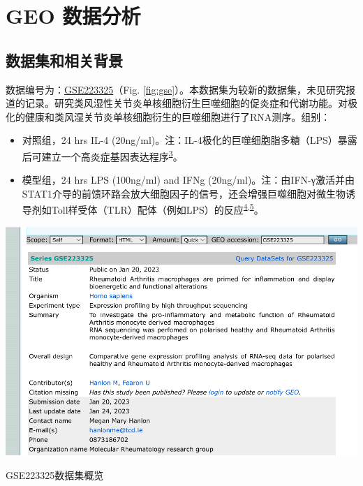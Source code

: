 \documentclass[
]{article}
\providecommand{\tightlist}{%
  \setlength{\itemsep}{0pt}\setlength{\parskip}{0pt}}
\begin{document}
\hypertarget{geo-ux6570ux636eux5206ux6790}{%
\section{GEO 数据分析}\label{geo-ux6570ux636eux5206ux6790}}

\hypertarget{ux6570ux636eux96c6ux548cux76f8ux5173ux80ccux666f}{%
\subsection{数据集和相关背景}\label{ux6570ux636eux96c6ux548cux76f8ux5173ux80ccux666f}}

数据编号为：\href{https://www.ncbi.nlm.nih.gov/geo/query/acc.cgi?acc=GSE223325}{GSE223325}（Fig. \ref{fig:gse}）。本数据集为较新的数据集，未见研究报道的记录。研究类风湿性关节炎单核细胞衍生巨噬细胞的促炎症和代谢功能。对极化的健康和类风湿关节炎单核细胞衍生的巨噬细胞进行了RNA测序。组别：

\begin{itemize}
\tightlist
\item
  对照组，24 hrs IL-4 (20ng/ml)。注：IL-4极化的巨噬细胞脂多糖（LPS）暴露后可建立一个高炎症基因表达程序\textsuperscript{\protect\hyperlink{ref-czimmerer_epigenetic_2022}{3}}。
\item
  模型组，24 hrs LPS (100ng/ml) and IFNg (20ng/ml)。注：由IFN-γ激活并由STAT1介导的前馈环路会放大细胞因子的信号，还会增强巨噬细胞对微生物诱导剂如Toll样受体（TLR）配体（例如LPS）的反应\textsuperscript{\protect\hyperlink{ref-hu_regulation_2008}{4},\protect\hyperlink{ref-chen_ifn-_2010}{5}}。
\end{itemize}

\bgroup {}
\includegraphics[width=13.89in]{thesis_fig/gse223325_capture} \caption{GSE223325数据集概览}\label{fig:gse}
\makeatletter \egroup
\end{document}
